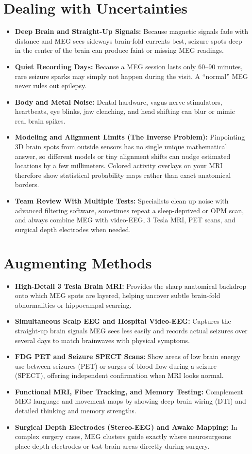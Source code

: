 \section{Dealing with Uncertainties}
\begin{itemize}
  \item \textbf{Deep Brain and Straight-Up Signals:} Because magnetic signals fade with distance and MEG sees sideways brain-fold currents best, seizure spots deep in the center of the brain can produce faint or missing MEG readings.
  \item \textbf{Quiet Recording Days:} Because a MEG session lasts only 60--90 minutes, rare seizure sparks may simply not happen during the visit. A ``normal'' MEG never rules out epilepsy.
  \item \textbf{Body and Metal Noise:} Dental hardware, vagus nerve stimulators, heartbeats, eye blinks, jaw clenching, and head shifting can blur or mimic real brain spikes.
  \item \textbf{Modeling and Alignment Limits (The Inverse Problem):} Pinpointing 3D brain spots from outside sensors has no single unique mathematical answer, so different models or tiny alignment shifts can nudge estimated locations by a few millimeters. Colored activity overlays on your MRI therefore show statistical probability maps rather than exact anatomical borders.
  \item \textbf{Team Review With Multiple Tests:} Specialists clean up noise with advanced filtering software, sometimes repeat a sleep-deprived or OPM scan, and always combine MEG with video-EEG, 3 Tesla MRI, PET scans, and surgical depth electrodes when needed.
\end{itemize}

\section{Augmenting Methods}
\begin{itemize}
  \item \textbf{High-Detail 3 Tesla Brain MRI:} Provides the sharp anatomical backdrop onto which MEG spots are layered, helping uncover subtle brain-fold abnormalities or hippocampal scarring.
  \item \textbf{Simultaneous Scalp EEG and Hospital Video-EEG:} Captures the straight-up brain signals MEG sees less easily and records actual seizures over several days to match brainwaves with physical symptoms.
  \item \textbf{FDG PET and Seizure SPECT Scans:} Show areas of low brain energy use between seizures (PET) or surges of blood flow during a seizure (SPECT), offering independent confirmation when MRI looks normal.
  \item \textbf{Functional MRI, Fiber Tracking, and Memory Testing:} Complement MEG language and movement maps by showing deep brain wiring (DTI) and detailed thinking and memory strengths.
  \item \textbf{Surgical Depth Electrodes (Stereo-EEG) and Awake Mapping:} In complex surgery cases, MEG clusters guide exactly where neurosurgeons place depth electrodes or test brain areas directly during surgery.
\end{itemize}

